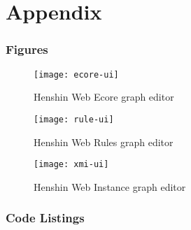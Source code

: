 \chapter{Appendix}
  \label{sec:appendix}

  \subsection{Figures}

  \begin{figure}[H]
    \centering
    \texttt{[image: ecore-ui]}
    \caption{Henshin Web Ecore graph editor}
    \label{fig:ecore-ui}
  \end{figure}

  \begin{figure}[H]
    \centering
    \texttt{[image: rule-ui]}
    \caption{Henshin Web Rules graph editor}
    \label{fig:rule-ui}
  \end{figure}

  \begin{figure}[H]
    \centering
    \texttt{[image: xmi-ui]}
    \caption{Henshin Web Instance graph editor}
    \label{fig:xmi-ui}
  \end{figure}

  \subsection{Code Listings}



